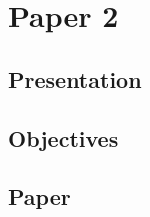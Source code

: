 \chapter{Paper 2}%
\label{ch:paper2}

\section{Presentation}

\lipsum[21]

\section{Objectives}

\lipsum[22]

\section{Paper}

\lipsum[23]
